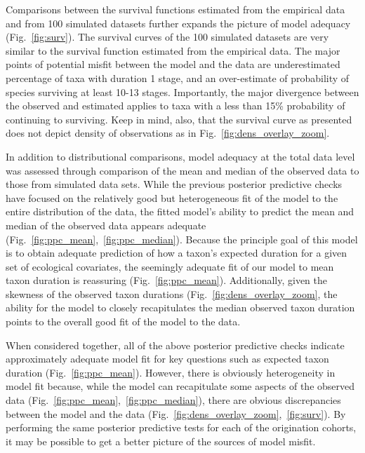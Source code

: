 \documentclass[11pt]{article}
\begin{document}
Comparisons between the survival functions estimated from the empirical data and from 100 simulated datasets further expands the picture of model adequacy (Fig.~\ref{fig:surv}). The survival curves of the 100 simulated datasets are very similar to the survival function estimated from the empirical data. The major points of potential misfit between the model and the data are underestimated percentage of taxa with duration 1 stage, and an over-estimate of probability of species surviving at least 10-13 stages. Importantly, the major divergence between the observed and estimated applies to taxa with a less than 15\% probability of continuing to surviving. Keep in mind, also, that the survival curve as presented does not depict density of observations as in Fig.~\ref{fig:dens_overlay_zoom}.

In addition to distributional comparisons, model adequacy at the total data level was assessed through comparison of the mean and median of the observed data to those from simulated data sets. While the previous posterior predictive checks have focused on the relatively good but heterogeneous fit of the model to the entire distribution of the data, the fitted model's ability to predict the mean and median of the observed data appears adequate (Fig.~\ref{fig:ppc_mean},~\ref{fig:ppc_median}). Because the principle goal of this model is to obtain adequate prediction of how a taxon's expected duration for a given set of ecological covariates, the seemingly adequate fit of our model to mean taxon duration is reassuring (Fig.~\ref{fig:ppc_mean}). Additionally, given the skewness of the observed taxon durations (Fig.~\ref{fig:dens_overlay_zoom}, the ability for the model to closely recapitulates the median observed taxon duration points to the overall good fit of the model to the data.

When considered together, all of the above posterior predictive checks indicate approximately adequate model fit for key questions such as expected taxon duration (Fig.~\ref{fig:ppc_mean}). However, there is obviously heterogeneity in model fit because, while the model can recapitulate some aspects of the observed data (Fig.~\ref{fig:ppc_mean},~\ref{fig:ppc_median}), there are obvious discrepancies between the model and the data (Fig.~\ref{fig:dens_overlay_zoom},~\ref{fig:surv}). By performing the same posterior predictive tests for each of the origination cohorts, it may be possible to get a better picture of the sources of model misfit.
\end{document}
